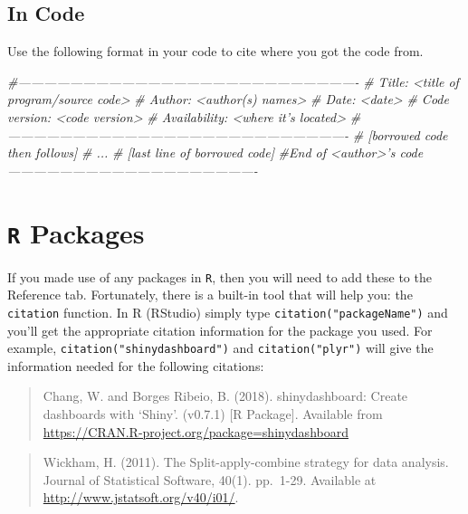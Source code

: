 \documentclass[
]{book}
\newenvironment{Shaded}{\begin{snugshade}}{\end{snugshade}}
\newcommand{\CommentTok}[1]{\textcolor[rgb]{0.56,0.35,0.01}{\textit{#1}}}
\begin{document}
\hypertarget{in-code}{%
\subsection{In Code}\label{in-code}}

Use the following format in your code to cite where you got the code from.

\begin{Shaded}
\begin{Highlighting}[]
\CommentTok{#-------------------------------------------------------------------------------}
\CommentTok{#  Title: <title of program/source code>}
\CommentTok{#  Author: <author(s) names>}
\CommentTok{#  Date: <date>}
\CommentTok{#  Code version: <code version>}
\CommentTok{#  Availability: <where it's located>}
\CommentTok{#-------------------------------------------------------------------------------}
\CommentTok{# [borrowed code then follows]}
\CommentTok{# ...}
\CommentTok{# [last line of borrowed code]      }
\CommentTok{#End of <author>'s code----------------------------------------------------------}
\end{Highlighting}
\end{Shaded}

\hypertarget{r-packages}{%
\section{\texorpdfstring{\texttt{R} Packages}{R Packages}}\label{r-packages}}

If you made use of any packages in \texttt{R}, then you will need to add these to the Reference tab. Fortunately, there is a built-in tool that will help you: the \texttt{citation} function. In R (RStudio) simply type \texttt{citation("packageName")} and you'll get the appropriate citation information for the package you used. For example, \texttt{citation("shinydashboard")} and \texttt{citation("plyr")} will give the information needed for the following citations:

\begin{quote}
Chang, W. and Borges Ribeio, B. (2018). shinydashboard: Create dashboards with `Shiny'. (v0.7.1) {[}R Package{]}. Available from \url{https://CRAN.R-project.org/package=shinydashboard}
\end{quote}

\begin{quote}
Wickham, H. (2011). The Split-apply-combine strategy for data analysis. Journal of Statistical Software, 40(1). pp.~1-29. Available at \url{http://www.jstatsoft.org/v40/i01/}.
\end{quote}
\end{document}
